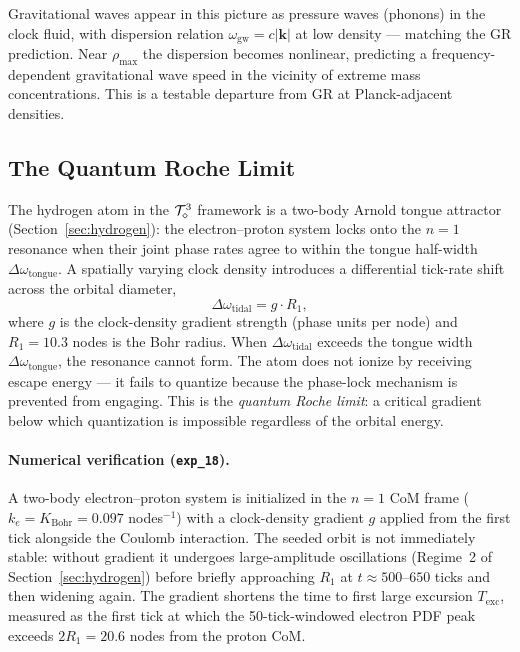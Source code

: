 Gravitational waves appear in this picture as pressure waves (phonons)
in the clock fluid, with dispersion relation $\omega_\text{gw} = c|\mathbf{k}|$
at low density --- matching the GR prediction.
Near $\rho_\text{max}$ the dispersion becomes nonlinear, predicting a
frequency-dependent gravitational wave speed in the vicinity of extreme
mass concentrations.
This is a testable departure from GR at Planck-adjacent densities.

\subsection{The Quantum Roche Limit}
\label{subsec:quantum_roche}

The hydrogen atom in the $\mathcal{T}_\diamond^3$ framework is a two-body Arnold tongue
attractor (Section~\ref{sec:hydrogen}): the electron--proton system locks onto
the $n=1$ resonance when their joint phase rates agree to within the tongue
half-width $\Delta\omega_\text{tongue}$.
A spatially varying clock density introduces a differential tick-rate shift
across the orbital diameter,
\begin{equation}
    \Delta\omega_\text{tidal} = g \cdot R_1,
    \label{eq:tidal_detuning}
\end{equation}
where $g$ is the clock-density gradient strength (phase units per node) and
$R_1 = 10.3$ nodes is the Bohr radius.
When $\Delta\omega_\text{tidal}$ exceeds the tongue width $\Delta\omega_\text{tongue}$,
the resonance cannot form.
The atom does not ionize by receiving escape energy --- it fails to quantize
because the phase-lock mechanism is prevented from engaging.
This is the \emph{quantum Roche limit}: a critical gradient below which
quantization is impossible regardless of the orbital energy.

\paragraph{Numerical verification (\texttt{exp\_18}).}
A two-body electron--proton system is initialized in the $n=1$ CoM frame
($k_e = K_\text{Bohr} = 0.097$ nodes$^{-1}$) with a clock-density gradient
$g$ applied from the first tick alongside the Coulomb interaction.
The seeded orbit is not immediately stable: without gradient it undergoes
large-amplitude oscillations (Regime~2 of Section~\ref{sec:hydrogen}) before
briefly approaching $R_1$ at $t \approx 500$--$650$ ticks and then widening again.
The gradient shortens the time to first large excursion $T_\text{exc}$,
measured as the first tick at which the 50-tick-windowed electron PDF peak
exceeds $2R_1 = 20.6$ nodes from the proton CoM.


